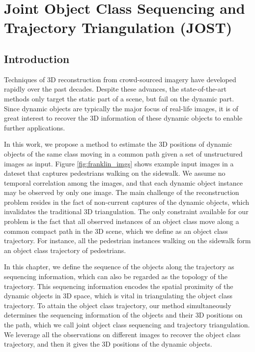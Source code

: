 \chapter{Joint Object Class Sequencing and Trajectory Triangulation (JOST)} \label{ch:jost}

\section{Introduction}

Techniques of 3D reconstruction from crowd-sourced imagery have developed rapidly over the past decades. %
Despite these advances, the state-of-the-art methods only target the static part of a scene, but fail on the dynamic part. Since dynamic objects are typically the major focus of real-life images, it is of great interest to recover the 3D information of these dynamic objects to enable further applications.

In this work, we propose a method to estimate the 3D positions of dynamic objects of the same class moving in a common path given a set of unstructured images as input. 
Figure \ref{fig:franklin_imgs} shows example input images in a dateset that captures pedestrians walking on the sidewalk. We assume no temporal correlation among the images, and that each dynamic object instance may be observed by only one image. 
The main challenge of the reconstruction problem resides in the fact of non-current captures of the dynamic objects, which invalidates the traditional 3D triangulation. 
The only constraint available for our problem is the fact that all observed instances of an object class move along a common compact path in the 3D scene, which we define as an object class trajectory. For instance, all the pedestrian instances walking on the sidewalk form an object class trajectory of pedestrians.

In this chapter, we define the sequence of the objects along the trajectory as sequencing information, which can also be regarded as the topology of the trajectory. This sequencing information encodes the spatial proximity of the dynamic objects in 3D space, which is vital in triangulating the object class trajectory.
To attain the object class trajectory, our method simultaneously determines the sequencing information of the objects and their 3D positions on the path, which we call joint object class sequencing and trajectory triangulation. We leverage all the observations on different images to recover the object class trajectory, and then it gives the 3D positions of the dynamic objects.

